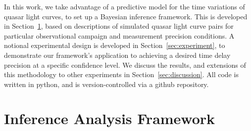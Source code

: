 \documentclass{emulateapj}
\begin{document}
In this work, we take advantage of a predictive model for the time
variations of quasar light curves, to set up a Bayesian inference
framework.  This is developed in Section~\ref{sec:tdanalysis}, based
on descriptions of simulated quasar light curve pairs for particular
observational campaign and measurement precision conditions.  A
notional experimental design is developed in
Section~\ref{sec:experiment}, to demonstrate our framework's
application to achieving a desired time delay precision at a specific
confidence level.  We discuss the results, and extensions of this
methodology to other experiments in Section~\ref{sec:discussion}.  All
code is written in python, and is version-controlled via a github
repository.

\section{Inference Analysis Framework}\label{sec:tdanalysis}
\end{document}
